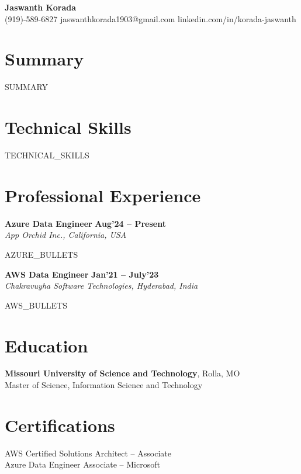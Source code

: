 \documentclass[11pt,letterpaper]{article}
\begin{document}
\begin{center}
{\Large \textbf{Jaswanth Korada}}\\
(919)-589-6827 \textbar{} jaswanthkorada1903@gmail.com \textbar{} linkedin.com/in/korada-jaswanth
\end{center}

\section*{Summary}
{{SUMMARY}}

\section*{Technical Skills}
{{TECHNICAL_SKILLS}}

\section*{Professional Experience}
\textbf{Azure Data Engineer} \hfill \textbf{Aug'24 -- Present}\\
\textit{App Orchid Inc., California, USA}
\begin{itemize}
{{AZURE_BULLETS}}
\end{itemize}

\textbf{AWS Data Engineer} \hfill \textbf{Jan'21 -- July'23}\\
\textit{Chakravuyha Software Technologies, Hyderabad, India}
\begin{itemize}
{{AWS_BULLETS}}
\end{itemize}

\section*{Education}
\textbf{Missouri University of Science and Technology}, Rolla, MO\\
Master of Science, Information Science and Technology

\section*{Certifications}
AWS Certified Solutions Architect -- Associate\\
Azure Data Engineer Associate -- Microsoft
\end{document}
